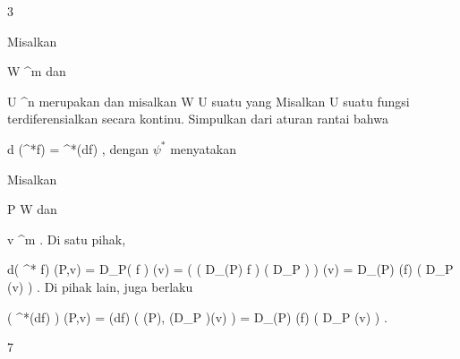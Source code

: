 {3}

{

Misalkan

\mavergleichskette
{\vergleichskette
{ W
}
{ \subseteq }{ \R^m
}
{  }{
}
{    }{
}
{   }{
}
}
{}{}{}
dan

\mavergleichskette
{\vergleichskette
{ U
}
{ \subseteq }{ \R^n
}
{  }{
}
{    }{
}
{   }{
}
}
{}{}{}
merupakan
dan misalkan
\maabbdisp {\psi} { W } { U
} {}
suatu
yang
Misalkan
 { U } {\R
} {}
suatu fungsi terdiferensialkan secara kontinu. Simpulkan dari
aturan rantai
bahwa

\mavergleichskettedisp
{\vergleichskette
{ d (\psi^*f)
}
{ =} { \psi^*(df)
}
{ } {
}
{ } {
}
{ } {
}
}
{}{}{,}
dengan $\psi^*$ menyatakan

}
{

Misalkan

\mavergleichskette
{\vergleichskette
{ P
}
{ \in }{  W
}
{  }{
}
{    }{
}
{   }{
}
}
{}{}{}
dan

\mavergleichskette
{\vergleichskette
{ v
}
{ \in }{  \R^m
}
{  }{
}
{    }{
}
{   }{
}
}
{}{}{.}
Di satu pihak,

\mavergleichskettedisp
{\vergleichskette
{ d( \psi^* f) (P,v)
}
{ =} { D_P( f \circ \psi) (v)
}
{ =} { \left(  \left(  D_{\psi(P)} f  \right)  \circ \left(  D_P  \psi  \right)  \right) (v)
}
{ =} { D_{\psi(P)} (f) \left(  D_P \psi(v)  \right)
}
{ } {
}
}
{}{}{.}
Di pihak lain, juga berlaku

\mavergleichskettedisp
{\vergleichskette
{ \left(  \psi^*(df)  \right) (P,v)
}
{ =} { (df) \left(  \psi(P), (D_P \psi )(v)  \right)
}
{ =} { D_{\psi(P)} (f) \left(  D_P \psi (v)  \right)
}
{ } {
}
{ } {
}
}
{}{}{.}

 }



{7}


